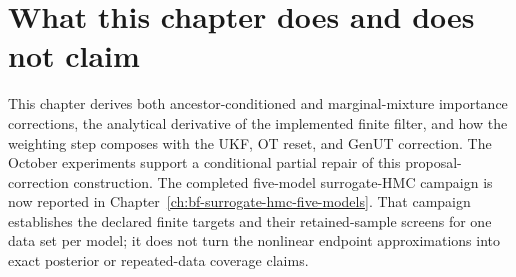\section{What this chapter does and does not claim}
\label{sec:bf-pfpf-chapter-boundary}

This chapter derives both ancestor-conditioned and marginal-mixture importance
corrections, the analytical derivative of the implemented finite filter, and
how the weighting step composes with the UKF, OT reset, and GenUT correction.
The October experiments support a conditional partial repair of this
proposal-correction construction.  The completed five-model surrogate-HMC
campaign is now reported in Chapter~\ref{ch:bf-surrogate-hmc-five-models}.
That campaign establishes the declared finite targets and their retained-sample
screens for one data set per model; it does not turn the nonlinear endpoint
approximations into exact posterior or repeated-data coverage claims.
